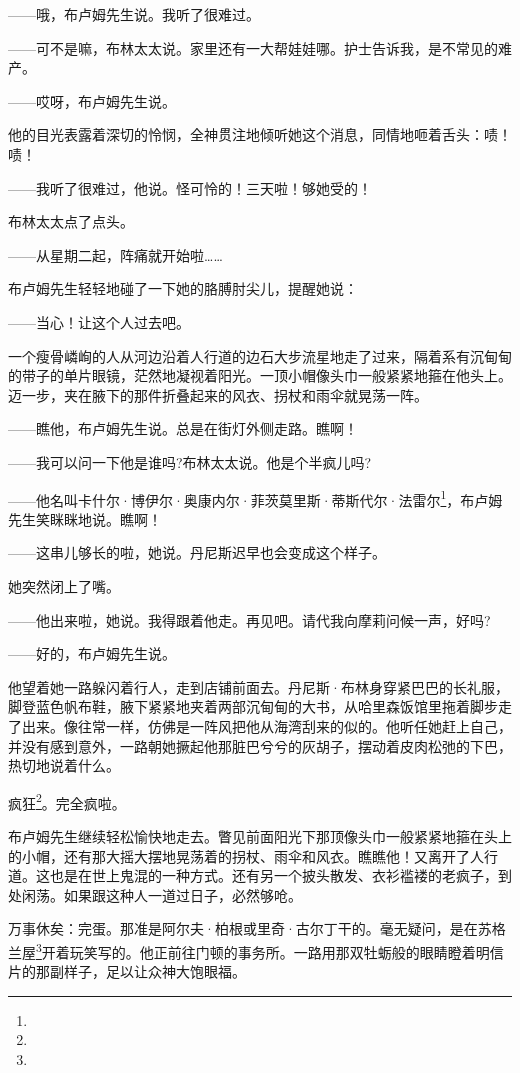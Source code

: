 \par ——哦，布卢姆先生说。我听了很难过。
\par ——可不是嘛，布林太太说。家里还有一大帮娃娃哪。护士告诉我，是不常见的难产。
\par ——哎呀，布卢姆先生说。
\par 他的目光表露着深切的怜悯，全神贯注地倾听她这个消息，同情地咂着舌头：啧！啧！
\par ——我听了很难过，他说。怪可怜的！三天啦！够她受的！
\par 布林太太点了点头。
\par ——从星期二起，阵痛就开始啦……
\par 布卢姆先生轻轻地碰了一下她的胳膊肘尖儿，提醒她说：
\par ——当心！让这个人过去吧。
\par 一个瘦骨嶙峋的人从河边沿着人行道的边石大步流星地走了过来，隔着系有沉甸甸的带子的单片眼镜，茫然地凝视着阳光。一顶小帽像头巾一般紧紧地箍在他头上。迈一步，夹在腋下的那件折叠起来的风衣、拐杖和雨伞就晃荡一阵。
\par ——瞧他，布卢姆先生说。总是在街灯外侧走路。瞧啊！
\par ——我可以问一下他是谁吗?布林太太说。他是个半疯儿吗?
\par ——他名叫卡什尔·博伊尔·奥康内尔·菲茨莫里斯·蒂斯代尔·法雷尔\footnote{}，布卢姆先生笑眯眯地说。瞧啊！
\par ——这串儿够长的啦，她说。丹尼斯迟早也会变成这个样子。
\par 她突然闭上了嘴。
\par ——他出来啦，她说。我得跟着他走。再见吧。请代我向摩莉问候一声，好吗?
\par ——好的，布卢姆先生说。
\par 他望着她一路躲闪着行人，走到店铺前面去。丹尼斯·布林身穿紧巴巴的长礼服，脚登蓝色帆布鞋，腋下紧紧地夹着两部沉甸甸的大书，从哈里森饭馆里拖着脚步走了出来。像往常一样，仿佛是一阵风把他从海湾刮来的似的。他听任她赶上自己，并没有感到意外，一路朝她撅起他那脏巴兮兮的灰胡子，摆动着皮肉松弛的下巴，热切地说着什么。
\par 疯狂\footnote{}。完全疯啦。
\par 布卢姆先生继续轻松愉快地走去。瞥见前面阳光下那顶像头巾一般紧紧地箍在头上的小帽，还有那大摇大摆地晃荡着的拐杖、雨伞和风衣。瞧瞧他！又离开了人行道。这也是在世上鬼混的一种方式。还有另一个披头散发、衣衫褴褛的老疯子，到处闲荡。如果跟这种人一道过日子，必然够呛。
\par 万事休矣：完蛋。那准是阿尔夫·柏根或里奇·古尔丁干的。毫无疑问，是在苏格兰屋\footnote{}开着玩笑写的。他正前往门顿的事务所。一路用那双牡蛎般的眼睛瞪着明信片的那副样子，足以让众神大饱眼福。
